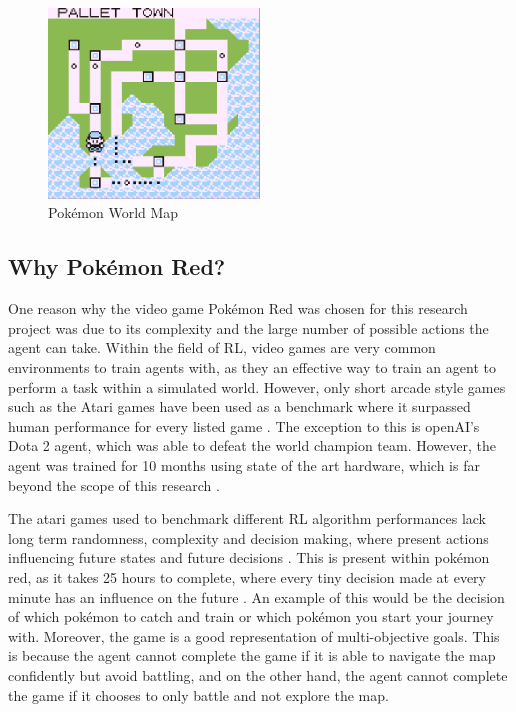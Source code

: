 \begin{figure}[H]
    \centering
    \includegraphics[width=0.5\textwidth]{figures/red_map.png}
    \caption{Pokémon World Map}
    \label{fig:pkmn_map}
\end{figure}

\subsection{Why Pokémon Red?}

One reason why the video game Pokémon Red was chosen for this research project was due to its complexity and the large number of possible actions the agent can take. Within the field of RL, video games are very common environments to train agents with, as they an effective way to train an agent to perform a task within a simulated world. However, only short arcade style games such as the Atari games have been used as a benchmark where it surpassed human performance for every listed game \cite{brockman2016openai}. The exception to this is openAI's Dota 2 agent, which was able to defeat the world champion team. However, the agent was trained for 10 months using state of the art hardware, which is far beyond the scope of this research \cite{berner2019dota}.

The atari games used to benchmark different RL algorithm performances lack long term randomness, complexity and decision making, where present actions influencing future states and future decisions \cite{brockman2016openai}. This is present within pokémon red, as it takes 25 hours to complete, where every tiny decision made at every minute has an influence on the future \cite{howlongtobeat}. An example of this would be the decision of which pokémon to catch and train or which pokémon you start your journey with. Moreover, the game is a good representation of multi-objective goals. This is because the agent cannot complete the game if it is able to navigate the map confidently but avoid battling, and on the other hand, the agent cannot complete the game if it chooses to only battle and not explore the map.

